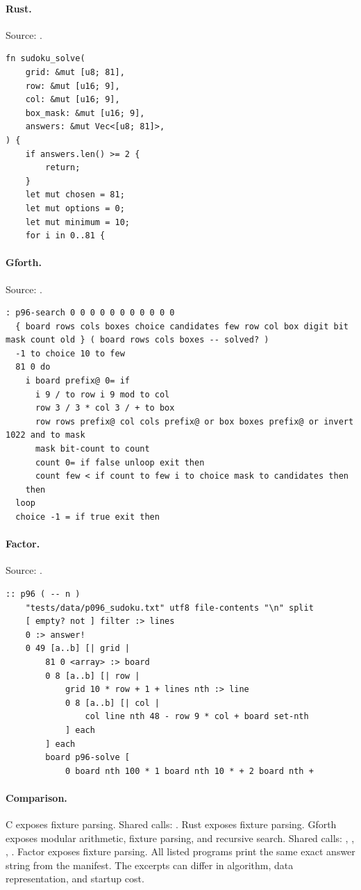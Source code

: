 \paragraph{Rust.} Source: .
\begin{lstlisting}
fn sudoku_solve(
    grid: &mut [u8; 81],
    row: &mut [u16; 9],
    col: &mut [u16; 9],
    box_mask: &mut [u16; 9],
    answers: &mut Vec<[u8; 81]>,
) {
    if answers.len() >= 2 {
        return;
    }
    let mut chosen = 81;
    let mut options = 0;
    let mut minimum = 10;
    for i in 0..81 {
\end{lstlisting}

\paragraph{Gforth.} Source: .
\begin{lstlisting}
: p96-search 0 0 0 0 0 0 0 0 0 0 0
  { board rows cols boxes choice candidates few row col box digit bit mask count old } ( board rows cols boxes -- solved? )
  -1 to choice 10 to few
  81 0 do
    i board prefix@ 0= if
      i 9 / to row i 9 mod to col
      row 3 / 3 * col 3 / + to box
      row rows prefix@ col cols prefix@ or box boxes prefix@ or invert 1022 and to mask
      mask bit-count to count
      count 0= if false unloop exit then
      count few < if count to few i to choice mask to candidates then
    then
  loop
  choice -1 = if true exit then
\end{lstlisting}

\paragraph{Factor.} Source: .
\begin{lstlisting}
:: p96 ( -- n )
    "tests/data/p096_sudoku.txt" utf8 file-contents "\n" split
    [ empty? not ] filter :> lines
    0 :> answer!
    0 49 [a..b] [| grid |
        81 0 <array> :> board
        0 8 [a..b] [| row |
            grid 10 * row + 1 + lines nth :> line
            0 8 [a..b] [| col |
                col line nth 48 - row 9 * col + board set-nth
            ] each
        ] each
        board p96-solve [
            0 board nth 100 * 1 board nth 10 * + 2 board nth +
\end{lstlisting}

\paragraph{Comparison.}
C exposes fixture parsing. Shared calls: \texttt{}. Rust exposes fixture parsing. Gforth exposes modular arithmetic, fixture parsing, and recursive search. Shared calls: \texttt{}, \texttt{}, \texttt{}, \texttt{}. Factor exposes fixture parsing.
All listed programs print the same exact answer string from the manifest. The excerpts can differ in algorithm, data representation, and startup cost.

